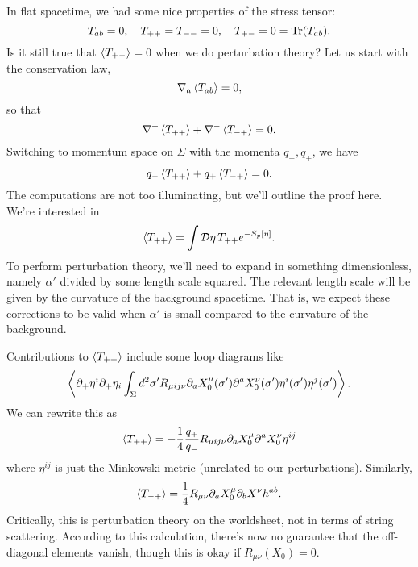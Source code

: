 In flat spacetime, we had some nice properties of the stress tensor:
\begin{equation}
    T_{ab} = 0,\quad T_{++}=T_{--}=0,\quad T_{+-}=0 = \operatorname{Tr}(T_{ab}).
\end{equation}
Is it still true that $\left< T_{+-} \right>=0$ when we do perturbation theory? Let us start with the conservation law,
\begin{equation}
    \nabla_a \left< T_{ab} \right>=0,
\end{equation}
so that
\begin{equation}
    \nabla^+ \left< T_{++} \right> + \nabla^- \left< T_{-+} \right>=0.
\end{equation}
Switching to momentum space on $\Sigma$ with the momenta $q_-,q_+$, we have
\begin{equation}
    q_-\left< T_{++} \right> + q_+ \left< T_{-+} \right>=0.
\end{equation}
The computations are not too illuminating, but we'll outline the proof here. We're interested in
\begin{equation}
    \left< T_{++} \right> = \int \mathcal{D} \eta\, T_{++} e^{-S_p[\eta]}.
\end{equation}
To perform perturbation theory, we'll need to expand in something dimensionless, namely $\alpha'$ divided by some length scale squared. The relevant length scale will be given by the curvature of the background spacetime. That is, we expect these corrections to be valid when $\alpha'$ is small compared to the curvature of the background.

Contributions to $\left< T_{++} \right>$ include some loop diagrams like
\begin{equation}
    \left< \partial_+ \eta^i \partial_+ \eta_i \int_\Sigma d^2 \sigma' R_{\mu i j\nu} \partial_a X^\mu_0(\sigma') \partial^a X^\nu_0 (\sigma') \eta^i(\sigma') \eta^j(\sigma') \right>.
\end{equation}
We can rewrite this as
\begin{equation}
    \left< T_{++} \right>=-\frac{1}{4} \frac{q_+}{q_-} R_{\mu i j\nu} \partial_a X^\mu_0 \partial^a X^\nu_0 \eta^{ij}
\end{equation}
where $\eta^{ij}$ is just the Minkowski metric (unrelated to our perturbations).
Similarly,
\begin{equation}
    \left< T_{-+} \right> = \frac{1}{4} R_{\mu\nu} \partial_a X_0^\mu \partial_b X^\nu h^{ab}.
\end{equation}
Critically, this is perturbation theory on the worldsheet, not in terms of string scattering. According to this calculation, there's now no guarantee that the off-diagonal elements vanish, though this is okay if $R_{\mu\nu}(X_0)=0$.

